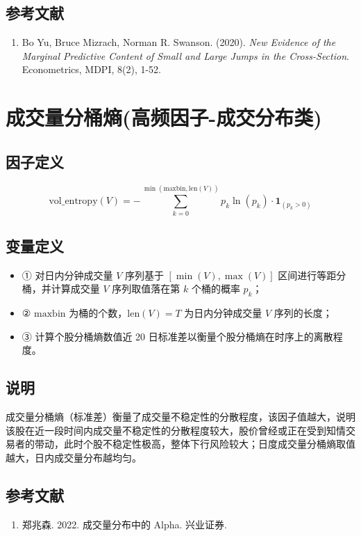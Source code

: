 \documentclass{article}
\begin{document}
\subsection{参考文献}
\begin{enumerate}
    \item Bo Yu, Bruce Mizrach, Norman R. Swanson. (2020). \textit{New Evidence of the Marginal Predictive Content of Small and Large Jumps in the Cross-Section}. Econometrics, MDPI, 8(2), 1-52.
\end{enumerate}

\section{成交量分桶熵(高频因子-成交分布类)}

\subsection{因子定义}
\begin{equation}
    \mathrm{vol\_entropy}(V) = -\sum_{k=0}^{\min(\mathrm{maxbin}, \mathrm{len}(V))} p_k \ln(p_k) \cdot \mathbf{1}_{(p_k > 0)}
\end{equation}

\subsection{变量定义}
\begin{itemize}
    \item ① 对日内分钟成交量 \( V \) 序列基于 \([\min(V), \max(V)]\) 区间进行等距分桶，并计算成交量 \( V \) 序列取值落在第 \( k \) 个桶的概率 \( p_k \)；
    \item ② \( \mathrm{maxbin} \) 为桶的个数，\( \mathrm{len}(V) = T \) 为日内分钟成交量 \( V \) 序列的长度；
    \item ③ 计算个股分桶熵数值近 20 日标准差以衡量个股分桶熵在时序上的离散程度。
\end{itemize}

\subsection{说明}
成交量分桶熵（标准差）衡量了成交量不稳定性的分散程度，该因子值越大，说明该股在近一段时间内成交量不稳定性的分散程度较大，股价曾经或正在受到知情交易者的带动，此时个股不稳定性极高，整体下行风险较大；日度成交量分桶熵取值越大，日内成交量分布越均匀。

\subsection{参考文献}
\begin{enumerate}
    \item 郑兆森. 2022. 成交量分布中的 Alpha. 兴业证券.
\end{enumerate}
\end{document}
